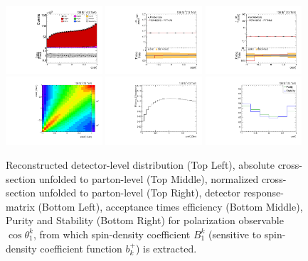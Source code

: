 \begin{figure}[htb]
\begin{center}
 \includegraphics[width=0.32\textwidth]{fig_fullRun2UL/controlplots/combined/Hyp_AntiLeptonBk.pdf}
 \includegraphics[width=0.32\textwidth]{fig_fullRun2UL/unfolding/combined/UnfoldedResults_b1k.pdf}
 \includegraphics[width=0.32\textwidth]{fig_fullRun2UL/unfolding/combined/UnfoldedResultsNorm_b1k.pdf} \\
 \includegraphics[width=0.32\textwidth]{fig_fullRun2UL/unfolding/combined/ResponseMatrix_b1k.pdf}
 \includegraphics[width=0.32\textwidth]{fig_fullRun2UL/unfolding/combined/TotEff_b1k.pdf}
 \includegraphics[width=0.32\textwidth]{fig_fullRun2UL/unfolding/combined/PurStab_b1k.pdf} \\
\caption{Reconstructed detector-level distribution (Top Left), absolute cross-section unfolded to parton-level (Top Middle), normalized cross-section unfolded to parton-level (Top Right), detector response-matrix (Bottom Left), acceptance times efficiency (Bottom Middle), Purity and Stability (Bottom Right) for polarization observable $\cos\theta_{1}^{k}$, from which spin-density coefficient $B_{1}^{k}$ (sensitive to spin-density coefficient function $b_k^{+}$) is extracted.}
\label{fig:b1k}
\end{center}
\end{figure}
